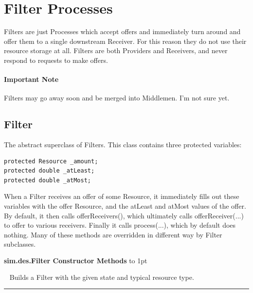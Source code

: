 \documentclass[twoside,10pt]{article}
\newcommand\class[1]{\index{Classes!{#1}}\textsf{#1}}
\newcommand*{\xfill}[1][0pt]{%
	\cleaders
		\hbox to 1pt{\hss
			\raisebox{#1}{\rule{1.2pt}{0.4pt}}%
			\hss}\hfill}
\newenvironment{methods}[1]{
\vspace{1.0em}\noindent\textsf{\textbf{#1 Methods}}\quad \xfill[0.5ex]
\vspace{-0.25em}
\begin{description}
\small}
{\end{description}\hrule\vspace{1.5em}}
\newcommand{\mthd}[1]{\item[{\sf #1}]~\newline}
\begin{document}
\section{Filter Processes}

Filters are just Processes which accept offers and immediately turn around and offer them to a single downstream Receiver.  For this reason they do not use their resource storage at all.  Filters are both Providers and Receivers, and never respond to requests to make offers.

\paragraph{Important Note} Filters may go away soon and be merged into Middlemen.  I'm not sure yet.

\subsection{Filter}

The abstract superclass of Filters.  This class contains three protected variables:

\begin{verbatim}
protected Resource _amount;
protected double _atLeast;
protected double _atMost;
\end{verbatim}

When a Filter receives an offer of some Resource, it immediately fills out these variables with the offer Resource, and the atLeast and atMost values of the offer.  By default, it then calls offerReceivers(), which ultimately calls offerReceiver(...) to offer to various receivers.  Finally it calls process(...), which by default does nothing.  Many of these methods are overridden in different way by Filter subclasses. 


\begin{methods}{\class{sim.des.Filter} Constructor}
\mthd{public Filter(SimState state, Resource typical)}
Builds a Filter with the given state and typical resource type.
\end{methods}
\end{document}
